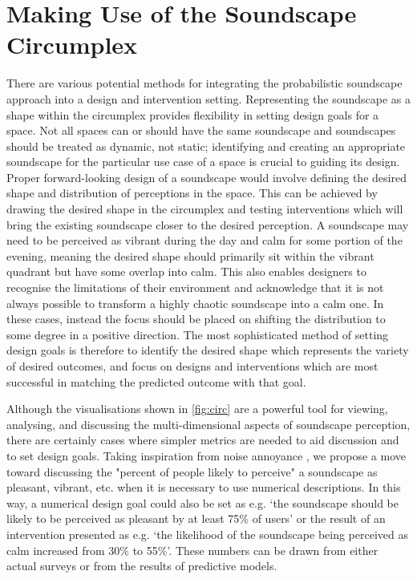 \section{Making Use of the Soundscape Circumplex}
There are various potential methods for integrating the probabilistic soundscape approach into a design and intervention setting. Representing the soundscape as a shape within the circumplex provides flexibility in setting design goals for a space. Not all spaces can or should have the same soundscape and soundscapes should be treated as dynamic, not static; identifying and creating an appropriate soundscape for the particular use case of a space is crucial to guiding its design. Proper forward-looking design of a soundscape would involve defining the desired shape and distribution of perceptions in the space. This can be achieved by drawing the desired shape in the circumplex and testing interventions which will bring the existing soundscape closer to the desired perception. A soundscape may need to be perceived as vibrant during the day and calm for some portion of the evening, meaning the desired shape should primarily sit within the vibrant quadrant but have some overlap into calm. This also enables designers to recognise the limitations of their environment and acknowledge that it is not always possible to transform a highly chaotic soundscape into a calm one. In these cases, instead the focus should be placed on shifting the distribution to some degree in a positive direction. The most sophisticated method of setting design goals is therefore to identify the desired shape which represents the variety of desired outcomes, and focus on designs and interventions which are most successful in matching the predicted outcome with that goal.

Although the visualisations shown in \autoref{fig:circ} are a powerful tool for viewing, analysing, and discussing the multi-dimensional aspects of soundscape perception, there are certainly cases where simpler metrics are needed to aid discussion and to set design goals. Taking inspiration from noise annoyance \citep{ISO15666}, we propose a move toward discussing the "percent of people likely to perceive" a soundscape as pleasant, vibrant, etc. when it is necessary to use numerical descriptions. In this way, a numerical design goal could also be set as e.g. `the soundscape should be likely to be perceived as pleasant by at least 75\% of users' or the result of an intervention presented as e.g. `the likelihood of the soundscape being perceived as calm increased from 30\% to 55\%'. These numbers can be drawn from either actual surveys or from the results of predictive models.

